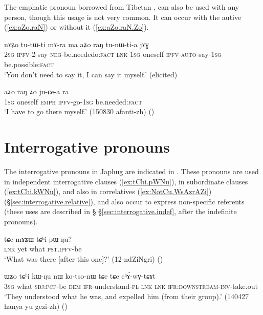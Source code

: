The emphatic pronoun  borrowed from Tibetan , can also be used with any person, though this usage is not very common. It can occur with the autive (\ref{ex:aZo.raN}) or without it (\ref{ex:aZo.raN.Zo}).

\begin{exe}
\ex \label{ex:aZo.raN}
\gll
nɤʑo tu-tɯ-ti mɤ-ra ma aʑo raŋ tu-nɯ-ti-a jɤɣ \\
\textsc{2sg} \textsc{ipfv}-2-say \textsc{neg}-be.neededo:\textsc{fact} \textsc{lnk} \textsc{1sg} oneself \textsc{ipfv}-\textsc{auto}-say-\textsc{1sg} be.possible:\textsc{fact} \\
\glt `You don't need to say it, I can say it myself.' (elicited)
\end{exe}

\begin{exe}
\ex \label{ex:aZo.raN.Zo}
\gll aʑo raŋ ʑo ju-ɕe-a ra \\
\textsc{1sg} oneself \textsc{emph} \textsc{ipfv}-go-\textsc{1sg} be.needed:\textsc{fact} \\
\glt `I have to go there myself.' (150830 afanti-zh)
()
\end{exe}

\section{Interrogative pronouns} \label{sec:interrogative.pronouns}
The interrogative pronouns in Japhug are indicated in . These pronouns are used in independent interrogative clauses (\ref{ex:tChi.pWNu}), in subordinate clauses (\ref{ex:tChi.kWNu}), and also in correlatives (\ref{ex:NotCu.WsAzrAZi}) (§\ref{sec:interrogative.relative}), and also occur to express non-specific referents (these uses are described in § §\ref{sec:interrogative.indef}, after the indefinite pronouns).

\begin{exe}
\ex \label{ex:tChi.pWNu}
\gll tɕe mɤʑɯ tɕʰi pɯ-ŋu? \\
\textsc{lnk} yet what \textsc{pst}.\textsc{ipfv}-be \\
\glt `What was there [after this one]?' (12-ndZiNgri) ()
\end{exe}  

\begin{exe}
\ex \label{ex:tChi.kWNu}
\gll ɯʑo tɕʰi kɯ-ŋu nɯ ko-tso-nɯ tɕe tɕe cʰɤ́-wɣ-tɕɤt \\
\textsc{3sg} what \textsc{sbj}:\textsc{pcp}-be \textsc{dem} \textsc{ifr}-understand-\textsc{pl} \textsc{lnk} \textsc{lnk} \textsc{ifr}:\textsc{downstream}-\textsc{inv}-take.out \\
\glt `They understood what he was, and expelled him (from their group).' (140427 hanya yu gezi-zh)
()
\end{exe}  

